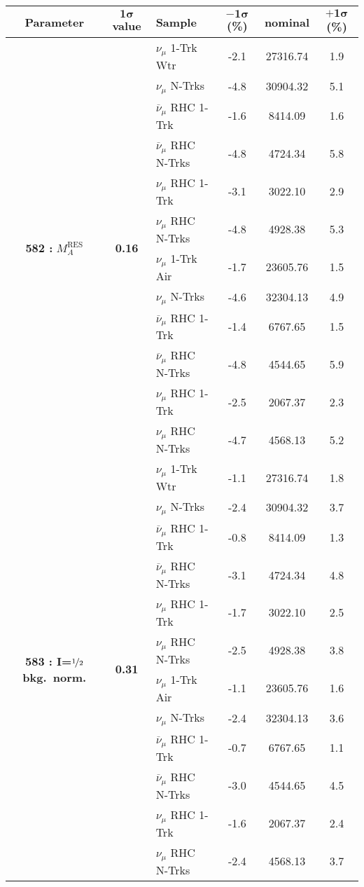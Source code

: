 \addtocounter{table}{-1}
\begin{table}[ht!]
\centering

\begin{tabular}{ c  c  l  c  c  c }
\midrule[1.3pt]
\textbf{Parameter} & \textbf{$\mathbf{1\sigma}$ value} & \textbf{Sample} & \textbf{$\mathbf{-1\sigma}$ (\%)}  &  \textbf{nominal}  &  \textbf{$\mathbf{+1\sigma}$ (\%)} \\
\midrule[1.3pt]
\multirow{12}{*}{\textbf{582 : }$M_A^\text{RES}$} & \multirow{12}{*}{\textbf{0.16}} & $\nu_\mu$ 1-Trk Wtr &   -2.1 &  27316.74 &   1.9 \\ 
 &  & $\nu_\mu$ N-Trks &   -4.8 &  30904.32 &   5.1 \\ 
 &  & $\overline{\nu}_\mu$ RHC 1-Trk &   -1.6 &  8414.09 &   1.6 \\ 
 &  & $\overline{\nu}_\mu$ RHC N-Trks &   -4.8 &  4724.34 &   5.8 \\ 
 &  & $\nu_\mu$ RHC 1-Trk &   -3.1 &  3022.10 &   2.9 \\ 
 &  & $\nu_\mu$ RHC N-Trks &   -4.8 &  4928.38 &   5.3 \\ 
 &  & $\nu_\mu$ 1-Trk Air &   -1.7 &  23605.76 &   1.5 \\ 
 &  & $\nu_\mu$ N-Trks &   -4.6 &  32304.13 &   4.9 \\ 
 &  & $\overline{\nu}_\mu$ RHC 1-Trk &   -1.4 &  6767.65 &   1.5 \\ 
 &  & $\overline{\nu}_\mu$ RHC N-Trks &   -4.8 &  4544.65 &   5.9 \\ 
 &  & $\nu_\mu$ RHC 1-Trk &   -2.5 &  2067.37 &   2.3 \\ 
 &  & $\nu_\mu$ RHC N-Trks &   -4.7 &  4568.13 &   5.2 \\ 
\midrule[1.3pt]
\multirow{12}{*}{\textbf{583 : I=}$\nicefrac{1}{2}$ \textbf{bkg.\ norm.}} & \multirow{12}{*}{\textbf{0.31}} & $\nu_\mu$ 1-Trk Wtr &   -1.1 &  27316.74 &   1.8 \\ 
 &  & $\nu_\mu$ N-Trks &   -2.4 &  30904.32 &   3.7 \\ 
 &  & $\overline{\nu}_\mu$ RHC 1-Trk &   -0.8 &  8414.09 &   1.3 \\ 
 &  & $\overline{\nu}_\mu$ RHC N-Trks &   -3.1 &  4724.34 &   4.8 \\ 
 &  & $\nu_\mu$ RHC 1-Trk &   -1.7 &  3022.10 &   2.5 \\ 
 &  & $\nu_\mu$ RHC N-Trks &   -2.5 &  4928.38 &   3.8 \\ 
 &  & $\nu_\mu$ 1-Trk Air &   -1.1 &  23605.76 &   1.6 \\ 
 &  & $\nu_\mu$ N-Trks &   -2.4 &  32304.13 &   3.6 \\ 
 &  & $\overline{\nu}_\mu$ RHC 1-Trk &   -0.7 &  6767.65 &   1.1 \\ 
 &  & $\overline{\nu}_\mu$ RHC N-Trks &   -3.0 &  4544.65 &   4.5 \\ 
 &  & $\nu_\mu$ RHC 1-Trk &   -1.6 &  2067.37 &   2.4 \\ 
 &  & $\nu_\mu$ RHC N-Trks &   -2.4 &  4568.13 &   3.7 \\ 
\midrule[1.3pt]
\end{tabular}
\end{table}
